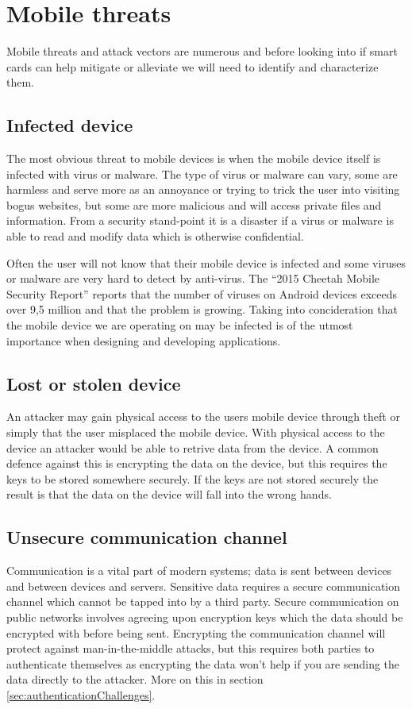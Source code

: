 \chapter{Mobile threats}
Mobile threats and attack vectors are numerous and before looking into if smart cards can help mitigate or alleviate we will need to identify and characterize them.
\section{Infected device}
The most obvious threat to mobile devices is when the mobile device itself is infected with virus or malware. The type of virus or malware can vary, some are harmless and serve more as an annoyance or trying to trick the user into visiting bogus websites, but some are more malicious and will access private files and information. From a security stand-point it is a disaster if a virus or malware is able to read and modify data which is otherwise confidential.

Often the user will not know that their mobile device is infected and some viruses or malware are very hard to detect by anti-virus. The ``2015 Cheetah Mobile Security Report'' \cite{cheetahSec} reports that the number of viruses on Android devices exceeds over 9,5 million and that the problem is growing. Taking into concideration that the mobile device we are operating on may be infected is of the utmost importance when designing and developing applications.

\section{Lost or stolen device}
An attacker may gain physical access to the users mobile device through theft or simply that the user misplaced the mobile device. With physical access to the device an attacker would be able to retrive data from the device. A common defence against this is encrypting the data on the device, but this requires the keys to be stored somewhere securely. If the keys are not stored securely the result is that the data on the device will fall into the wrong hands.

\section{Unsecure communication channel}
\label{sec:unsecureCommunication}
Communication is a vital part of modern systems; data is sent between devices and between devices and servers. Sensitive data requires a secure communication channel which cannot be tapped into by a third party. Secure communication on public networks involves agreeing upon encryption keys which the data should be encrypted with before being sent. Encrypting the communication channel will protect against man-in-the-middle attacks, but this requires both parties to authenticate themselves as encrypting the data won't help if you are sending the data directly to the attacker. More on this in section \ref{sec:authenticationChallenges}.

